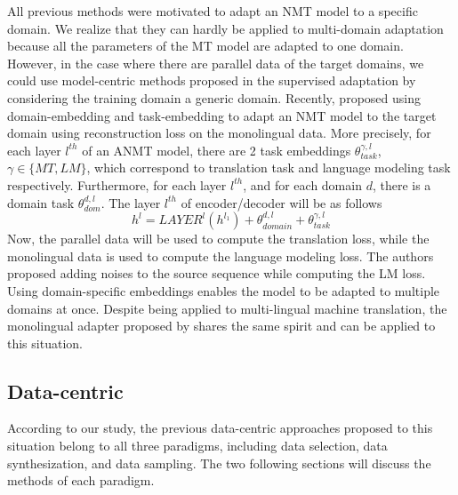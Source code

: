 All previous methods were motivated to adapt an NMT model to a specific domain. We realize that they can hardly be applied to multi-domain adaptation because all the parameters of the MT model are adapted to one domain. However, in the case where there are parallel data of the target domains, we could use model-centric methods proposed in the supervised adaptation by considering the training domain a generic domain. Recently, \citet{Dou19unsupervised} proposed using domain-embedding and task-embedding to adapt an NMT model to the target domain using reconstruction loss on the monolingual data. More precisely, for each layer $l^{th}$ of an ANMT model, there are 2 task embeddings $\theta_{task}^{\gamma,l}$, $\gamma \in \{ MT, LM \}$, which correspond to translation task and language modeling task respectively. Furthermore, for each layer $l^{th}$, and for each domain $d$, there is a domain task $\theta^{d,l}_{dom}$. The layer $l^{th}$ of encoder/decoder will be as follows
\begin{equation}
h^{l} = LAYER^l(h^{l_1}) + \theta^{d,l}_{domain} + \theta_{task}^{\gamma,l}
\end{equation}
Now, the parallel data will be used to compute the translation loss, while the monolingual data is used to compute the language modeling loss. The authors proposed adding noises to the source sequence while computing the LM loss. Using domain-specific embeddings enables the model to be adapted to multiple domains at once. Despite being applied to multi-lingual machine translation, the monolingual adapter proposed by \citet{Philip20monolingual} shares the same spirit and can be applied to this situation.
\subsection{Data-centric}
\label{ssec:case-2-data}
According to our study, the previous data-centric approaches proposed to this situation belong to all three paradigms, including data selection, data synthesization, and data sampling. The two following sections will discuss the methods of each paradigm.
